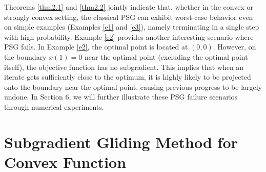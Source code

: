 \documentclass[sn-mathphys]{JORSC-jnl}%
\theoremstyle{thmstyleone}%
\theoremstyle{thmstylethree}%
\begin{document}
Theorems \ref{thm2.1} and \ref{thm2.2} jointly indicate that, whether in the convex or strongly convex setting, the classical PSG can exhibit worst-case behavior even on simple examples (Examples \ref{e1} and \ref{e3}), namely terminating in a single step with high probability. Example \ref{e2} provides another interesting scenario where PSG fails. In Example \ref{e2}, the optimal point is located at $(0,0)$. However, on the boundary $x(1) = 0$ near the optimal point (excluding the optimal point itself), the objective function has no subgradient. This implies that when an iterate gets sufficiently close to the optimum, it is highly likely to be projected onto the boundary near the optimal point, causing previous progress to be largely undone. In Section 6, we will further illustrate these PSG failure scenarios through numerical experiments.

\section{Subgradient Gliding Method for Convex Function}
\end{document}
